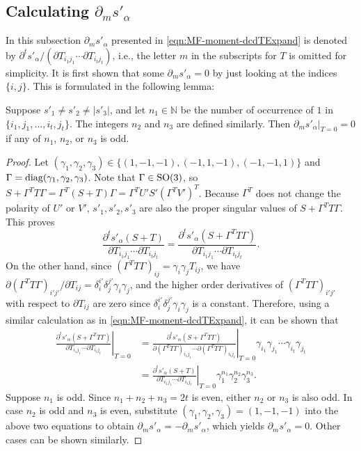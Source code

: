 \subsection{Calculating $\partial_m s'_\alpha$}

In this subsection $\partial_m s'_\alpha$ presented in \eqref{eqn:MF-moment-dcdTExpand} is denoted by $\partial^t s'_\alpha / \left( \partial T_{i_1j_1} \cdots \partial T_{i_tj_t} \right)$, i.e.,  the letter $m$ in the subscripts for $T$ is omitted for simplicity.
It is first shown that some $\partial_m s'_\alpha = 0$ by just looking at the indices $\{i,j\}$.
This is formulated in the following lemma:
\begin{lemma} \label{lemma:MF-moment-dsdT-zero}
	Suppose $s'_1 \neq s'_2 \neq |s'_3|$, and let $n_1\in\mathbb{N}$ be the number of occurrence of $1$ in $\{i_1,j_1,\ldots,i_t,j_t\}$.
	The integers $n_2$ and $n_3$ are defined similarly. 
	Then $\left. \partial_m s'_\alpha \right|_{T=0} = 0$ if any of $n_1$, $n_2$, or $n_3$ is odd.
\end{lemma}
\begin{proof}
	Let $(\gamma_1,\gamma_2,\gamma_3) \in \{(1,-1,-1),(-1,1,-1),(-1,-1,1)\}$ and $\Gamma = \mathrm{diag}(\gamma_1,\gamma_2,\gamma_3)$.
	Note that $\Gamma\in\mathrm{SO}(3)$, so $S+\Gamma^TT\Gamma = \Gamma^T(S+T)\Gamma = \Gamma^TU'S'(\Gamma^TV')^T$.
	Because $\Gamma^T$ does not change the polarity of $U'$ or $V'$, $s'_1,s'_2,s'_3$ are also the proper singular values of $S+\Gamma^TT\Gamma$.
	This proves
	\begin{equation*}
		\frac{\partial^t s'_\alpha(S+T)}{\partial T_{i_1j_1} \cdots \partial T_{i_tj_t}} = \frac{\partial^t s'_\alpha(S+\Gamma^TT\Gamma)}{\partial T_{i_1j_1} \cdots \partial T_{i_tj_t}}.
	\end{equation*}
	On the other hand, since $(\Gamma^TT\Gamma)_{ij} = \gamma_i\gamma_jT_{ij}$, we have $\partial (\Gamma^TT\Gamma)_{i'j'} / \partial T_{ij} = \delta_i^{i'}\delta_j^{j'}\gamma_i\gamma_j$, and the higher order derivatives of $(\Gamma^TT\Gamma)_{i'j'}$ with respect to $\partial T_{ij}$ are zero since $\delta_i^{i'}\delta_j^{j'}\gamma_i\gamma_j$ is a constant. 
	Therefore, using a similar calculation as in \eqref{eqn:MF-moment-dcdTExpand}, it can be shown that
	\begin{align*}
		\left. \frac{\partial^t s'_\alpha(S+\Gamma^TT\Gamma)}{\partial T_{i_1j_1} \cdots \partial T_{i_tj_t}} \right|_{T=0} &= \left. \frac{\partial^t s'_\alpha(S+\Gamma^TT\Gamma)}{\partial (\Gamma^TT\Gamma)_{i_1j_1} \cdots \partial (\Gamma^TT\Gamma)_{i_tj_t}} \right|_{T=0} \gamma_{i_1}\gamma_{j_1} \cdots \gamma_{i_t}\gamma_{j_t} \\
		&= \left. \frac{\partial^t s'_\alpha(S+T)}{\partial T_{i_1j_1} \cdots \partial T_{i_tj_t}} \right|_{T=0} \gamma_1^{n_1} \gamma_2^{n_2} \gamma_3^{n_3}.
	\end{align*}
	Suppose $n_1$ is odd. 
	Since $n_1+n_2+n_3 = 2t$ is even, either $n_2$ or $n_3$ is also odd.
	In case $n_2$ is odd and $n_3$ is even, substitute $(\gamma_1,\gamma_2,\gamma_3) = (1,-1,-1)$ into the above two equations to obtain $\partial_m s'_\alpha = -\partial_m s'_\alpha$, which yields $\partial_m s'_\alpha = 0$.
	Other cases can be shown similarly. 
\end{proof}

